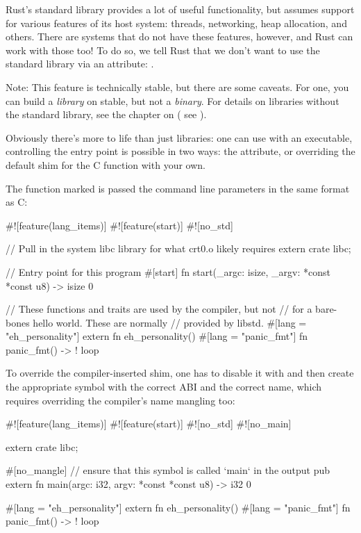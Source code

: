 Rust's standard library provides a lot of useful functionality, but assumes support for various features of its host system: 
threads, networking, heap allocation, and others. There are systems that do not have these features, however, and Rust can work 
with those too! To do so, we tell Rust that we don't want to use the standard library via an attribute: \code{\#![no\_std]}.

\begin{myquote}
Note: This feature is technically stable, but there are some caveats. For one, you can build a \code{\#![no\_std]} \emph{library} 
on stable, but not a \emph{binary}. For details on libraries without the standard library, see the chapter on \code{\#![no\_std]} (
see ).
\end{myquote}

Obviously there's more to life than just libraries: one can use \code{\#[no\_std]} with an executable, controlling the entry 
point is possible in two ways: the \code{\#[start]} attribute, or overriding the default shim for the C  function 
with your own.

\blank

The function marked \code{\#[start]} is passed the command line parameters in the same format as C:

\begin{rustc}
#![feature(lang_items)]
#![feature(start)]
#![no_std]

// Pull in the system libc library for what crt0.o likely requires
extern crate libc;

// Entry point for this program
#[start]
fn start(_argc: isize, _argv: *const *const u8) -> isize {
    0
}

// These functions and traits are used by the compiler, but not
// for a bare-bones hello world. These are normally
// provided by libstd.
#[lang = "eh_personality"] extern fn eh_personality() {}
#[lang = "panic_fmt"] fn panic_fmt() -> ! { loop {} }
\end{rustc}

To override the compiler-inserted  shim, one has to disable it with \code{\#![no\_main]} and then create the 
appropriate symbol with the correct ABI and the correct name, which requires overriding the compiler's name mangling too:

\begin{rustc}
#![feature(lang_items)]
#![feature(start)]
#![no_std]
#![no_main]

extern crate libc;

#[no_mangle] // ensure that this symbol is called `main` in the output
pub extern fn main(argc: i32, argv: *const *const u8) -> i32 {
    0
}

#[lang = "eh_personality"] extern fn eh_personality() {}
#[lang = "panic_fmt"] fn panic_fmt() -> ! { loop {} }
\end{rustc}

